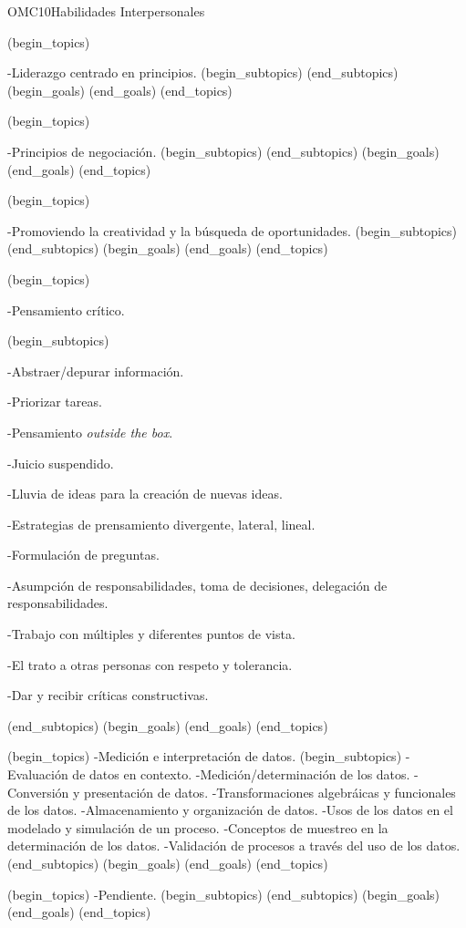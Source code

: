 \begin{BKL2}{OMC10}{Habilidades Interpersonales}
 

(begin_topics)

-Liderazgo centrado en principios.
(begin_subtopics)
(end_subtopics)
(begin_goals)
(end_goals)
(end_topics)

 

(begin_topics)

-Principios de negociación.
(begin_subtopics)
(end_subtopics)
(begin_goals)
(end_goals)
(end_topics)

 

(begin_topics)

-Promoviendo la creatividad y la búsqueda de oportunidades.
(begin_subtopics)
(end_subtopics)
(begin_goals)
(end_goals)
(end_topics)

 

(begin_topics)

-Pensamiento crítico.

(begin_subtopics)

-Abstraer/depurar información.

-Priorizar tareas.

-Pensamiento {\it outside the box}.

-Juicio suspendido.

-Lluvia de ideas para la creación de nuevas ideas.

-Estrategias de prensamiento divergente, lateral, lineal.

-Formulación de preguntas.

-Asumpción de responsabilidades, toma de decisiones, delegación de responsabilidades.

-Trabajo con múltiples y diferentes puntos de vista.

-El trato a otras personas  con respeto y tolerancia.

-Dar y recibir críticas constructivas.

(end_subtopics)
(begin_goals)
(end_goals)
(end_topics)

 
(begin_topics)
-Medición e interpretación de datos.
(begin_subtopics)
-Evaluación de datos en contexto.
-Medición/determinación de los datos.
-Conversión y presentación de datos.
-Transformaciones algebráicas y funcionales de los datos.
-Almacenamiento y organización de datos.
-Usos de los datos en el modelado y simulación de un proceso.
-Conceptos de muestreo en la determinación de los datos.
-Validación de procesos a través del uso de los datos.
(end_subtopics)
(begin_goals)
(end_goals)
(end_topics)

(begin_topics)
-Pendiente.
(begin_subtopics)
(end_subtopics)
(begin_goals)
(end_goals)
(end_topics)


\end{BKL2}
